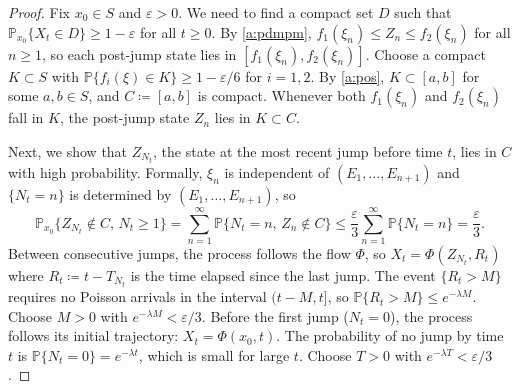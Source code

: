 \documentclass[12pt,reqno]{amsart}
\numberwithin{equation}{section}
\theoremstyle{definition}
\newcommand{\1}{\mathbbm{1}}
\newcommand{\PP}{\mathbb P}
\begin{document}
\begin{proof}
    Fix $x_0 \in S$ and $\varepsilon > 0$.  We need to find a compact set $D$
    such that $\PP_{x_0}\{X_t \in D\} \geq 1 - \varepsilon$ for all $t \geq 0$.
    By \cref{a:pdmpm},
    $f_1(\xi_n) \leq Z_n \leq f_2(\xi_n)$ for all $n \geq 1$, so each post-jump
    state lies in $[f_1(\xi_n), f_2(\xi_n)]$. Choose a compact $K \subset S$ with
    $\PP\{f_i(\xi) \in K\} \geq 1 - \varepsilon/6$ for $i = 1, 2$.  By
    \cref{a:pos}, $K \subset [a, b]$ for some $a, b \in S$, and $C \coloneq [a,
    b]$ is compact.  Whenever both $f_1(\xi_n)$ and $f_2(\xi_n)$ fall in $K$, the
    post-jump state $Z_n$ lies in $K \subset C$.

    Next, we show that $Z_{N_t}$, the state at the most recent jump before time
    $t$, lies in $C$ with high probability.  Formally, $\xi_n$ is independent of $(E_1, \ldots,
    E_{n+1})$ and $\{N_t = n\}$ is determined by $(E_1, \ldots, E_{n+1})$, so
    \begin{equation*}
        \PP_{x_0}\{Z_{N_t} \notin C, \, N_t \geq 1\}
        = \sum_{n=1}^{\infty} \PP\{N_t = n, \, Z_n \notin C\}
        \leq \frac{\varepsilon}{3}\sum_{n=1}^{\infty} \PP\{N_t = n\}
        = \frac{\varepsilon}{3}.
    \end{equation*}
    Between
    consecutive jumps, the process follows the flow $\Phi$, so $X_t =
    \Phi(Z_{N_t}, R_t)$ where $R_t \coloneq t - T_{N_t}$ is the time elapsed
    since the last jump.
    The event $\{R_t > M\}$ requires no Poisson arrivals in the interval
    $(t-M, t]$, so $\PP\{R_t > M\} \leq e^{-\lambda M}$.  Choose $M > 0$ with $e^{-\lambda M}
    < \varepsilon/3$.  Before the first jump ($N_t = 0$), the process
    follows its initial trajectory: $X_t = \Phi(x_0, t)$.  The probability of no
    jump by time $t$ is $\PP\{N_t = 0\} = e^{-\lambda t}$, which is small for
    large $t$.  Choose $T > 0$ with $e^{-\lambda T} < \varepsilon/3$.


\end{proof}
\end{document}
